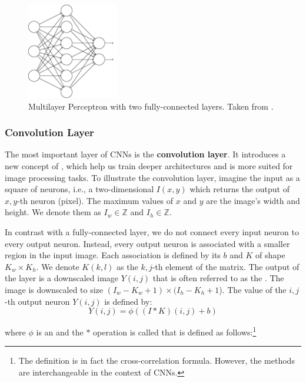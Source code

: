 \begin{figure}[h]
    \centering
    \includegraphics[width=4cm]{Sources/Figures/fully_connected_layer.png}
    \caption{Multilayer Perceptron with two fully-connected layers. Taken from
        \cite{nielsenneural}.}
    \label{fig:fcl}
\end{figure}

\subsubsection{Convolution Layer}

The most important layer of CNNs is the \textbf{convolution layer}. It
introduces a new concept of , which help us train deeper
architectures and is more suited for image processing tasks. To illustrate the
convolution layer, imagine the input as a square of neurons, i.e., a
two-dimensional  $I(x,y)$ which returns the output of $x,y$-th neuron
(pixel). The maximum values of $x$ and $y$ are the image's width and height.
We denote them as $I_w \in \mathds{Z}$ and $I_h \in \mathds{Z}$.


In contrast with a fully-connected layer, we do not connect every input neuron
to every output neuron. Instead, every output neuron is associated with a
smaller region in the input image. Each association is defined by its
 $b$ and  $K$ of shape $K_w \times K_h$.
We denote $K(k, l)$ as the $k,j$-th element of the matrix. The output of the layer
is a downscaled image $Y(i,j)$ that is often referred to as the .
The image is downscaled to size $(I_w - K_w + 1) \times (I_h - K_h + 1$).
    The value of the $i, j$-th output neuron $Y(i,j)$ is defined by:
$$
    Y(i, j) = \phi\left((I * K)(i,j) + b\right)
$$

where $\phi$ is an  and the $*$ operation is called 
that is defined as follows:\footnote{The definition is in fact the cross-correlation formula.
    However, the methods are interchangeable in the context of CNNs.}

